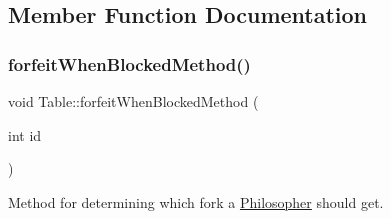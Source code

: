 \subsection{Member Function Documentation}
\mbox{\label{class_table_a28753e26544399b161fab6ece570a61d}} 
\subsubsection{\texorpdfstring{forfeit\+When\+Blocked\+Method()}{forfeitWhenBlockedMethod()}}
{\footnotesize\ttfamily void Table\+::forfeit\+When\+Blocked\+Method (\begin{DoxyParamCaption}\item[{int}]{id }\end{DoxyParamCaption})}



Method for determining which fork a \hyperlink{class_philosopher}{Philosopher} should get. 


